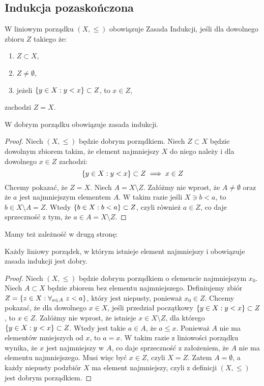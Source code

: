 \subsection{Indukcja pozaskończona}
\begin{definition}
    W liniowym porządku \( (X, \leq) \) obowiązuje Zasada Indukcji, jeśli dla dowolnego zbioru \( Z \) takiego że:
    \begin{enumerate}
        \item \( Z \subset X \),
        \item \( Z \neq \emptyset \),
        \item jeżeli \( \set{y \in X : y < x} \subset Z \), to \( x \in Z \),
    \end{enumerate}
    zachodzi \( Z = X \).
\end{definition}

\begin{theorem}
    W dobrym porządku obowiązuje zasada indukcji.
\end{theorem}
\begin{proof}
    Niech \( (X, \leq) \) będzie dobrym porządkiem. Niech \( Z \subset X \) będzie dowolnym zbiorem takim, że element najmniejszy \( X \) do niego należy
    i dla dowolnego \( x \in Z \) zachodzi:
    \[
        \set{y \in X : y < x} \subset Z \implies x \in Z
    \]
    Chcemy pokazać, że \( Z = X \). Niech \( A = X \setminus Z \). Załóżmy nie wprost, że \( A \neq \emptyset \) oraz że \( a \) jest najmniejszym elementem \( A \).
    W takim razie jeśli \( X \ni b < a \), to \( b \in X \setminus A = Z \). Wtedy \( \set{b \in X : b < a} \subset Z \), czyli również \( a \in Z \), co daje sprzeczność z tym, że \( a \in A = X \setminus Z \).
\end{proof}

Mamy też zależność w drugą stronę:
\begin{theorem}
    Każdy liniowy porządek, w którym istnieje element najmniejszy i obowiązuje zasada indukcji jest dobry.
\end{theorem}
\begin{proof}
    Niech \( (X, \leq) \) będzie dobrym porządkiem o elemencie najmniejszym \( x_0 \). Niech \( A \subset X \) będzie zbiorem bez elementu najmniejszego.
    Definiujemy zbiór \( Z = \set{z \in X : \forall_{a \in A} \ z < a} \), który jest niepusty, ponieważ \( x_0 \in Z \).
    Chcemy pokazać, że dla dowolnego \( x \in X \), jeśli przedział początkowy \( \set{y \in X : y < x} \subset Z \), to \( x \in Z \).
    Załóżmy nie wprost, że istnieje \( x \in X \setminus Z \), dla którego \( \set{y \in X : y < x} \subset Z \). Wtedy jest takie \( a \in A \),
    że \( a \leq x \). Ponieważ \( A \) nie ma elementów mniejszych od \( x \), to \( a = x \). W takim razie z liniowości porządku wynika, że \( x \) jest najmniejszy w \( A \),
    co daje sprzeczność z założeniem, że \( A \) nie ma elementu najmniejszego. Musi więc być \( x \in Z \), czyli \( X = Z \).
    Zatem \( A = \emptyset \), a każdy niepusty podzbiór \( X \) ma element najmniejszy, czyli z definicji \( (X, \leq) \) jest dobrym porządkiem.
\end{proof}


